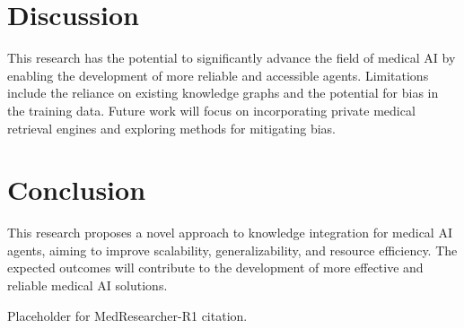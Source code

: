 \documentclass{article}
\begin{document}
\section{Discussion}
This research has the potential to significantly advance the field of medical AI by enabling the development of more reliable and accessible agents. Limitations include the reliance on existing knowledge graphs and the potential for bias in the training data. Future work will focus on incorporating private medical retrieval engines and exploring methods for mitigating bias.

\section{Conclusion}
This research proposes a novel approach to knowledge integration for medical AI agents, aiming to improve scalability, generalizability, and resource efficiency. The expected outcomes will contribute to the development of more effective and reliable medical AI solutions.

\begin{thebibliography}{9}
 Placeholder for MedResearcher-R1 citation.
\end{thebibliography}
\end{document}
